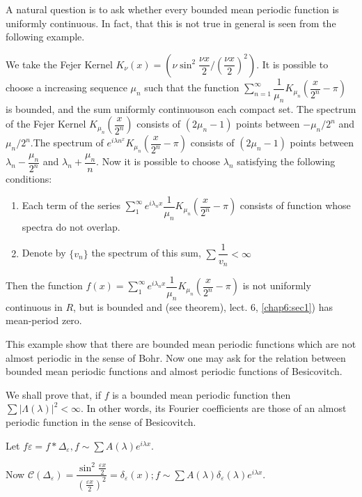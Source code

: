 A natural question is to ask whether every bounded mean periodic
function is uniformly continuous. In fact, that this is not true in
general is seen from the following example. 

We take the Fejer Kernel $K_\nu (x) = (\nu \sin^2 \dfrac{\nu x}{2} /
(\dfrac{\nu x}{2})^2)$. It is possible to choose a increasing sequence
$\mu_n$ such that the function $\sum\limits_{n = 1}^\infty
\dfrac{1}{\mu_n} K_{\mu_n} (\dfrac{x}{2^n} - \pi)$ is bounded, and the sum
uniformly continuous\pageoriginale on each compact set. The spectrum of the Fejer
Kernel $K_{\mu_n} (\dfrac{x}{2^n})$ consists of $(2 \mu_n - 1)$ points
between $- \mu_n/2^n$ and $\mu_n / 2^n$.The spectrum of $e^{i \lambda
 n^x} K_{\mu_n} (\dfrac{x}{2^n} - \pi)$ consists of $(2 \mu_n - 1)$
points between $\lambda_n- \dfrac{\mu_n}{2^n}$ and $\lambda_n +
\dfrac{\mu_n}{n}$. Now it is possible to choose $\lambda_n$ satisfying
the following conditions: 
\begin{enumerate}[(1)]
\item Each term of the series $\sum\limits_{1}^{\infty} e^{i \lambda_n
 x}\dfrac{1}{\mu_n} K_{\mu_n} (\dfrac{x}{2^n} - \pi)$ consists of
 function whose spectra do not overlap. 
\item Denote by $\{v_n \}$ the spectrum of this sum, $\sum
 \dfrac{1}{v_n} < \infty$ 
\end{enumerate}

Then the function $f(x) = \sum\limits_{1}^{\infty} e^{i \lambda_n x}
\dfrac{1}{\mu_n} K_{\mu_n} \left(\dfrac{x}{2^n} - \pi\right)$ is not uniformly
continuous in $R$, but is bounded and (see theorem), lect. 6, \ref{chap6:sec1})
has mean-period zero. 

This example show that there are bounded mean periodic functions which
are not almost periodic in the sense of Bohr. Now one may ask for the
relation between bounded mean periodic functions and almost periodic
functions of Besicovitch. 

We shall prove that, if $f$ is a bounded mean periodic function then
$\sum \big|\Lambda (\lambda)\big|^2 < \infty$. In other words, its
Fourier coefficients are those of an almost periodic function in the
sense of Besicovitch. 

Let $f \varepsilon = f * \Delta_{\varepsilon }, f \sim \sum A
(\lambda) e^{i \lambda x}$.

Now $\mathscr{C} (\Delta_{\varepsilon}) = \dfrac{\sin^2
 \frac{\varepsilon x}{2}}{\left(\frac{\varepsilon x}{2}\right)^2} = \delta
_{\varepsilon} (x) ; f \sim \sum A (\lambda) \delta
_{\varepsilon} (\lambda ) e^{i \lambda x}$. 

